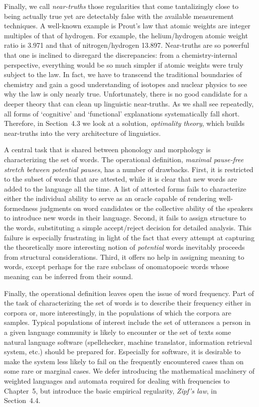Finally, we call {\it near-truths} those regularities that
come tantalizingly close to being actually true yet are detectably false with
the available measurement techniques. A well-known example is Prout's law that
atomic weights are integer multiples of that of hydrogen. For example, the
helium/hydrogen atomic weight ratio is 3.971 and that of nitrogen/hydrogen
13.897.  Near-truths are so powerful that one is inclined to disregard the
discrepancies: from a chemistry-internal perspective, everything would be so
much simpler if atomic weights were truly subject to the law. In fact, we have
to transcend the traditional boundaries of chemistry and gain a good
understanding of isotopes and nuclear physics to see why the law is only
nearly true. Unfortunately, there is no good candidate for a deeper theory
that can clean up linguistic near-truths. As we shall see repeatedly, all
forms of `cognitive' and `functional' explanations systematically fall
short. Therefore, in Section~4.3 we look at a solution, {\it optimality theory}, which
builds near-truths into the very architecture of linguistics.

A central task that is shared between phonology and morphology is
characterizing the set of words. The operational definition, {\it maximal
pause-free stretch between potential pauses}, has a number of drawbacks.
First, it is restricted to the subset of words that are attested, while it is
clear that new words are added to the language all the time. A list of
attested forms fails to characterize either the individual ability to serve as
an oracle capable of rendering well-formedness judgments on word candidates
or the collective ability of the speakers to introduce new words in their
language. Second, it fails to assign structure to the words, substituting a
simple accept/reject decision for detailed analysis. This failure is
especially frustrating in light of the fact that every attempt at
capturing the theoretically more interesting notion of {\it potential} words
inevitably proceeds from structural considerations.  Third, it offers no help
in assigning meaning to words, except perhaps for the rare subclass of
onomatopoeic words whose meaning can be inferred from their sound. 

Finally, the operational definition leaves open the issue of word frequency.
Part of the task of characterizing the set of words is to describe their
frequency either in corpora or, more interestingly, in the populations of
which the corpora are samples. Typical populations of interest include the set
of utterances a person in a given language community is likely to encounter
or the set of texts some natural language software (spellchecker, machine
translator, information retrieval system, etc.) should be prepared for.
Especially for software, it is desirable to make the system less likely to
fail on the frequently encountered cases than on some rare or marginal cases.
We defer introducing the mathematical machinery of weighted languages and
automata required for dealing with frequencies to Chapter~5, but introduce the
basic empirical regularity, {\it Zipf's law}, in Section~4.4.


